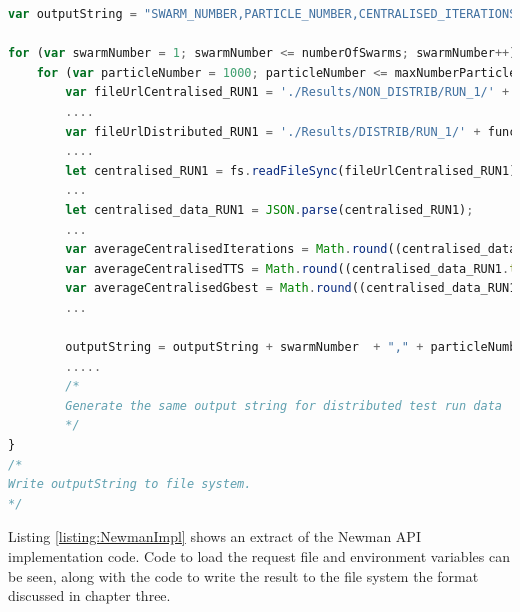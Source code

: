 \documentclass[oneside,12pt]{book}
\begin{document}
\begin{lstlisting}[basicstyle=\footnotesize, language=JavaScript]
var outputString = "SWARM_NUMBER,PARTICLE_NUMBER,CENTRALISED_ITERATIONS,CENTRALISED_TIME_TO_SOLUTION,CENTRALISED_FINAL_GROUP_BEST,DISTRIBUTED_ITERATIONS,DISTRIBUTED_TIME_TO_SOLUTION,DISTRIBUTED_FINAL_GROUP_BEST\n";

for (var swarmNumber = 1; swarmNumber <= numberOfSwarms; swarmNumber++) {
    for (var particleNumber = 1000; particleNumber <= maxNumberParticles; particleNumber += particleIncrement) {
        var fileUrlCentralised_RUN1 = './Results/NON_DISTRIB/RUN_1/' + functionName + '/' + functionName + '_' + swarmNumber + '_' + particleNumber + '.result.json';
        ....
        var fileUrlDistributed_RUN1 = './Results/DISTRIB/RUN_1/' + functionName + '/' + functionName + '_' + swarmNumber + '_' + particleNumber + '.result.json';
        ....
        let centralised_RUN1 = fs.readFileSync(fileUrlCentralised_RUN1);
        ...
        let centralised_data_RUN1 = JSON.parse(centralised_RUN1);
        ...
        var averageCentralisedIterations = Math.round((centralised_data_RUN1.iterations + centralised_data_RUN2.iterations + centralised_data_RUN3.iterations)/3);
        var averageCentralisedTTS = Math.round((centralised_data_RUN1.timeToSolution + centralised_data_RUN2.timeToSolution + centralised_data_RUN3.timeToSolution)/3);
        var averageCentralisedGbest = Math.round((centralised_data_RUN1.finalGroupBest + centralised_data_RUN2.finalGroupBest + centralised_data_RUN3.finalGroupBest)/3);
        ...

        outputString = outputString + swarmNumber  + "," + particleNumber + "," + averageCentralisedIterations + "," + averageCentralisedTTS + "," + averageCentralisedGbest + ",";
        .....
        /*
        Generate the same output string for distributed test run data
        */
}
/*
Write outputString to file system. 
*/
\end{lstlisting}
\label{listing:DataAggregation}

Listing \ref{listing:NewmanImpl} shows an extract of the Newman API implementation code. Code to load the request file and environment variables can be seen, along with the code to write the result to the file system the format discussed in chapter three. 
\end{document}
